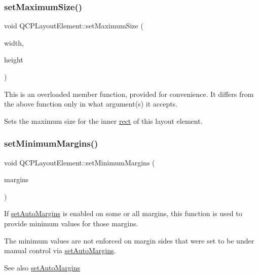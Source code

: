 \subsubsection{\texorpdfstring{set\+Maximum\+Size()}{setMaximumSize()}\hspace{0.1cm}{\footnotesize\ttfamily [2/2]}}
{\footnotesize\ttfamily void Q\+C\+P\+Layout\+Element\+::set\+Maximum\+Size (\begin{DoxyParamCaption}\item[{int}]{width,  }\item[{int}]{height }\end{DoxyParamCaption})}

This is an overloaded member function, provided for convenience. It differs from the above function only in what argument(s) it accepts.

Sets the maximum size for the inner \hyperlink{class_q_c_p_layout_element_a208effccfe2cca4a0eaf9393e60f2dd4}{rect} of this layout element. \mbox{\label{class_q_c_p_layout_element_a0a8a17abc16b7923159fcc7608f94673}} 
\subsubsection{\texorpdfstring{set\+Minimum\+Margins()}{setMinimumMargins()}}
{\footnotesize\ttfamily void Q\+C\+P\+Layout\+Element\+::set\+Minimum\+Margins (\begin{DoxyParamCaption}\item[{const Q\+Margins \&}]{margins }\end{DoxyParamCaption})}

If \hyperlink{class_q_c_p_layout_element_accfda49994e3e6d51ed14504abf9d27d}{set\+Auto\+Margins} is enabled on some or all margins, this function is used to provide minimum values for those margins.

The minimum values are not enforced on margin sides that were set to be under manual control via \hyperlink{class_q_c_p_layout_element_accfda49994e3e6d51ed14504abf9d27d}{set\+Auto\+Margins}.

\begin{DoxySeeAlso}{See also}
\hyperlink{class_q_c_p_layout_element_accfda49994e3e6d51ed14504abf9d27d}{set\+Auto\+Margins} 
\end{DoxySeeAlso}
\mbox{\label{class_q_c_p_layout_element_a5dd29a3c8bc88440c97c06b67be7886b}} 
